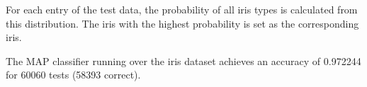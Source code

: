\documentclass[a4paper,12px]{article}
\begin{document}
For each entry of the test data, the probability of all iris types is calculated
from this distribution. The iris with the highest probability is set as the
corresponding iris.

The MAP classifier running over the iris dataset achieves an accuracy of
0.972244 for 60060 tests (58393 correct).


% 
% 
\end{document}
